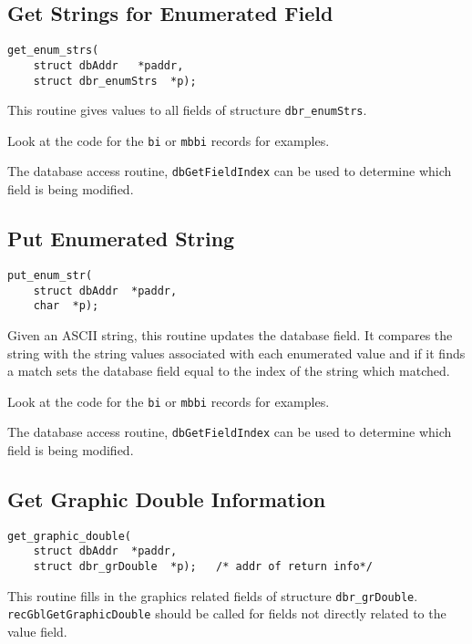 \subsection{Get Strings for Enumerated Field}

\begin{verbatim}
get_enum_strs(
    struct dbAddr   *paddr,
    struct dbr_enumStrs  *p);
\end{verbatim}

This routine gives values to all fields of structure \verb|dbr_enumStrs|.

Look at the code for the \verb|bi| or \verb|mbbi| records for examples.

The database access routine, \verb|dbGetFieldIndex| can be used to determine which field is being modified.

\subsection{Put Enumerated String}

\begin{verbatim}
put_enum_str(
    struct dbAddr  *paddr,
    char  *p);
\end{verbatim}

Given an ASCII string, this routine updates the database field. It compares the string with the string values associated with 
each enumerated value and if it finds a match sets the database field equal to the index of the string which matched.

Look at the code for the \verb|bi| or \verb|mbbi| records for examples.

The database access routine, \verb|dbGetFieldIndex| can be used to determine which field is being modified.

\subsection{Get Graphic Double Information}

\begin{verbatim}
get_graphic_double(
    struct dbAddr  *paddr,
    struct dbr_grDouble  *p);   /* addr of return info*/
\end{verbatim}

This routine fills in the graphics related fields of structure \verb|dbr_grDouble|. \verb|recGblGetGraphicDouble| should be 
called for fields not directly related to the value field.

